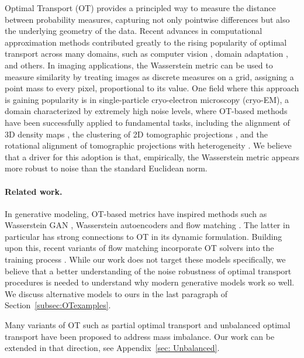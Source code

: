 \documentclass{article}
\theoremstyle{plain}
\theoremstyle{definition}
\theoremstyle{remark}
\begin{document}
Optimal Transport (OT) provides a principled way to measure the distance between probability measures, capturing not only pointwise differences but also the underlying geometry of the data. Recent advances in computational approximation methods \citep{Cuturi2013,Schmitzer2019} contributed greatly to the rising popularity of optimal transport across many domains, such as computer vision \citep{FeydyRoussillonTrouveGori2019}, domain adaptation \citep{CourtyFlamaryTuiaRakotomamonjy2017}, and others.
In imaging applications, the Wasserstein metric can be used to measure similarity by treating images as discrete measures on a grid, assigning a point mass to every pixel, proportional to its value.
One field where this approach is gaining popularity is in single-particle cryo-electron microscopy (cryo-EM), a domain characterized by extremely high noise levels, where OT-based methods have been successfully applied to fundamental tasks, including the alignment of 3D density maps \citep{RiahiWoollardPoitevinCondonDuc2023,SingerYang2024}, the clustering of 2D tomographic projections \citep{RaoMoscovichSinger2020}, and the rotational alignment of tomographic projections with heterogeneity \citep{ShiSingerVerbeke2025}.
We believe that a driver for this adoption is that, empirically, the Wasserstein metric appears more robust to noise than the standard Euclidean norm.


\paragraph{Related work.}
In generative modeling, OT-based metrics have inspired methods such as Wasserstein GAN \citep{ArjovskyChintalaBottou2017}, Wasserstein autoencoders \citep{TolstikhinBousquetGellySchoelkopf2017} and flow matching \citep{LipmanChenBen-HamuNickelLe2022, AlbergoVanden-Eijnden2022, LiuGongLiu2022}. The latter in particular has strong connections to OT in its dynamic formulation. Building upon this, recent variants of flow matching incorporate OT solvers into the training process \citep{TongFatrasMalkinHuguetZhangEtAl2024, ChemseddineHagemannSteidlWald2025, ZhangMousavi-HosseiniKleinCuturi2025, Mousavi-HosseiniZhangKleinCuturi2025}.
While our work does not target these models specifically, we believe that a better understanding of the noise robustness of optimal transport procedures is needed to understand why modern generative models work so well. We discuss alternative models to ours in the last paragraph of Section~\ref{subsec:OTexamples}.

Many variants of OT such as partial optimal transport \citep{ChapelAlayaGasso2020, RaghvendraShirzadianZhang2024a} 
and unbalanced optimal transport \citep{BenamouCarlierCuturiNennaPeyre2015, ChizatPeyreSchmitzerVialard2018} have been proposed to address mass imbalance. Our work can be extended in that direction, see Appendix~\ref{sec: Unbalanced}.
\end{document}
